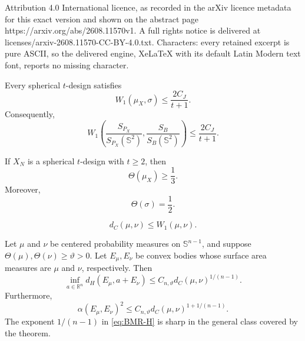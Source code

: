 \documentclass[10pt,a4paper]{amsart}
\newcommand{\R}{\mathbb R}
\newcommand{\Sph}{\mathbb S}
\begin{document}
Attribution 4.0 International licence, as recorded in the arXiv licence metadata for this exact version and shown on the abstract page https://arxiv.org/abs/2608.11570v1. A full rights notice is delivered at licenses/arxiv-2608.11570-CC-BY-4.0.txt. Characters: every retained excerpt is pure ASCII, so the delivered engine, XeLaTeX with its default Latin Modern text font, reports no missing character.
\begin{theorem}\label{thm:w1}
Every spherical $t$-design satisfies
\begin{equation}\label{eq:w1}
W_1(\mu_X,\sigma)\le\frac{2C_J}{t+1}.
\end{equation}
Consequently,
\begin{equation}\label{eq:w1-surface}
W_1\!\left(\frac{S_{P_X}}{S_{P_X}(\Sph^2)},\frac{S_B}{S_B(\Sph^2)}\right)
\le\frac{2C_J}{t+1}.
\end{equation}
\end{theorem}

\begin{proposition}\label{prop:dispersion}
If $X_N$ is a spherical $t$-design with $t\ge2$, then
\begin{equation}\label{eq:dispersion}
\Theta(\mu_X)\ge\frac13.
\end{equation}
Moreover,
\[
\Theta(\sigma)=\frac12.
\]
\end{proposition}

\begin{equation}\label{eq:dc-w1}
d_C(\mu,\nu)\le W_1(\mu,\nu).
\end{equation}

\begin{theorem}\label{thm:BMR}
Let $\mu$ and $\nu$ be centered probability measures on $\Sph^{n-1}$, and suppose $\Theta(\mu),\Theta(\nu)\ge\vartheta>0$. Let $E_\mu,E_\nu$ be convex bodies whose surface area measures are $\mu$ and $\nu$, respectively. Then
\begin{equation}\label{eq:BMR-H}
\inf_{a\in\R^n}d_H(E_\mu,a+E_\nu)
\le C_{n,\vartheta}d_C(\mu,\nu)^{1/(n-1)}.
\end{equation}
Furthermore,
\begin{equation}\label{eq:BMR-F}
\alpha(E_\mu,E_\nu)^2
\le C_{n,\vartheta}d_C(\mu,\nu)^{1+1/(n-1)}.
\end{equation}
The exponent $1/(n-1)$ in \eqref{eq:BMR-H} is sharp in the general class covered by the theorem.
\end{theorem}
\end{document}
